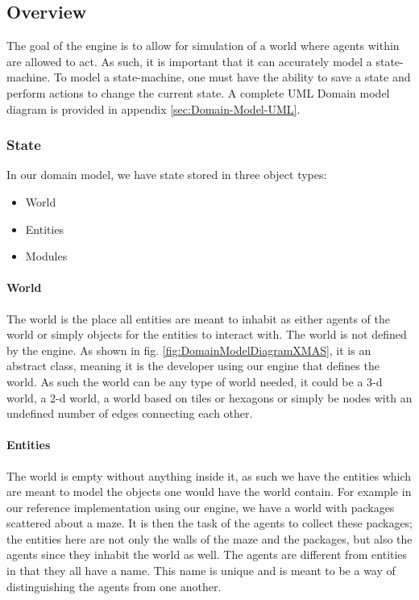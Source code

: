 
\subsection{Overview}

The goal of the engine is to allow for simulation of a world where
agents within are allowed to act. As such, it is important that it
can accurately model a state-machine. To model a state-machine, one
must have the ability to save a state and perform actions to change
the current state. A complete UML Domain model diagram is provided
in appendix \ref{sec:Domain-Model-UML}.


\subsubsection{State}

In our domain model, we have state stored in three object types:
\begin{itemize}
\item World
\item Entities
\item Modules
\end{itemize}

\paragraph*{World}

The world is the place all entities are meant to inhabit as either
agents of the world or simply objects for the entities to interact
with. The world is not defined by the engine. As shown in fig. \ref{fig:DomainModelDiagramXMAS},
it is an abstract class, meaning it is the developer using our engine
that defines the world. As such the world can be any type of world
needed, it could be a 3-d world, a 2-d world, a world based on tiles
or hexagons or simply be nodes with an undefined number of edges connecting
each other.


\paragraph*{Entities}

The world is empty without anything inside it, as such we have the
entities which are meant to model the objects one would have the world
contain. For example in our reference implementation using our engine,
we have a world with packages scattered about a maze. It is then the
task of the agents to collect these packages; the entities here are
not only the walls of the maze and the packages, but also the agents
since they inhabit the world as well. The agents are different from
entities in that they all have a name. This name is unique and is
meant to be a way of distinguishing the agents from one another. 


